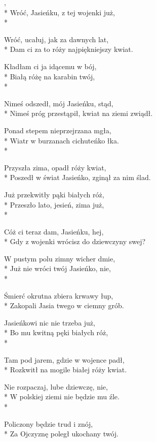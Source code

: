 \begin{lyrics}[longestline={Nimeś próg przestąpił, kwiat na ziemi zwiądł.}]

,\\*
Wróć, Jasieńku, z tej wojenki już,\\*
\begin{markverses}%
Wróć, ucałuj, jak za dawnych lat,\\*
Dam ci za to róży najpiękniejszy kwiat.
\end{markverses}

Kładłam ci ja idącemu w bój,\\*
Białą różę na karabin twój,\\*
\begin{markverses}%
Nimeś odszedł, mój Jasieńku, stąd,\\*
Nimeś próg przestąpił, kwiat na ziemi zwiądł.
\end{markverses}

Ponad stepem nieprzejrzana mgła,\\*
Wiatr w burzanach cichuteńko łka.\\*
\begin{markverses}%
Przyszła zima, opadł róży kwiat,\\*
Poszedł w świat Jasieńko, zginął za nim ślad.
\end{markverses}

Już przekwitły pąki białych róż,\\*
Przeszło lato, jesień, zima już,\\*
\begin{markverses}%
Cóż ci teraz dam, Jasieńku, hej,\\*
Gdy z wojenki wrócisz do dziewczyny swej?
\end{markverses}

W pustym polu zimny wicher dmie,\\*
Już nie wróci twój Jasieńko, nie,\\*
\begin{markverses}%
Śmierć okrutna zbiera krwawy łup,\\*
Zakopali Jasia twego w ciemny grób.
\end{markverses}

Jasieńkowi nic nie trzeba już,\\*
Bo mu kwitną pęki białych róż,\\*
\begin{markverses}%
Tam pod jarem, gdzie w wojence padł,\\*
Rozkwitł na mogile białej róży kwiat.
\end{markverses}

Nie rozpaczaj, lube dziewczę, nie,\\*
W polskiej ziemi nie będzie mu źle.\\*
\begin{markverses}%
Policzony będzie trud i znój,\\*
Za Ojczyznę poległ ukochany twój.
\end{markverses}
\end{lyrics}



